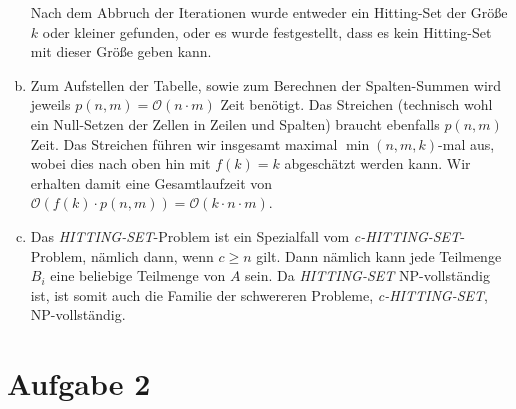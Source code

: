 \documentclass[12pt,a4paper]{article}
\begin{document}
\begin{enumerate}[a)]
 		Nach dem Abbruch der Iterationen wurde entweder ein Hitting-Set der Größe $k$ oder kleiner gefunden, oder es wurde festgestellt, dass es kein Hitting-Set mit dieser Größe geben kann.

	\item Zum Aufstellen der Tabelle, sowie zum Berechnen der Spalten-Summen wird jeweils $p(n,m) = \mathcal{O}(n \cdot m)$ Zeit benötigt. Das Streichen (technisch wohl ein Null-Setzen der Zellen in Zeilen und Spalten) braucht ebenfalls $p(n,m)$ Zeit. Das Streichen führen wir insgesamt maximal $\min(n,m,k)$-mal aus, wobei dies nach oben hin mit $f(k) = k$ abgeschätzt werden kann. Wir erhalten damit eine Gesamtlaufzeit von $\mathcal{O}(f(k) \cdot p(n,m)) = \mathcal{O}(k \cdot n \cdot m)$.

	\item Das \textit{HITTING-SET}-Problem ist ein Spezialfall vom \textit{c-HITTING-SET}-Problem, nämlich dann, wenn $c \geq n$ gilt. Dann nämlich kann jede Teilmenge $B_i$ eine beliebige Teilmenge von $A$ sein. Da \textit{HITTING-SET} NP-vollständig ist, ist somit auch die Familie der schwereren Probleme, \textit{c-HITTING-SET}, NP-vollständig. 

\end{enumerate}

\section*{Aufgabe 2}
\end{document}
